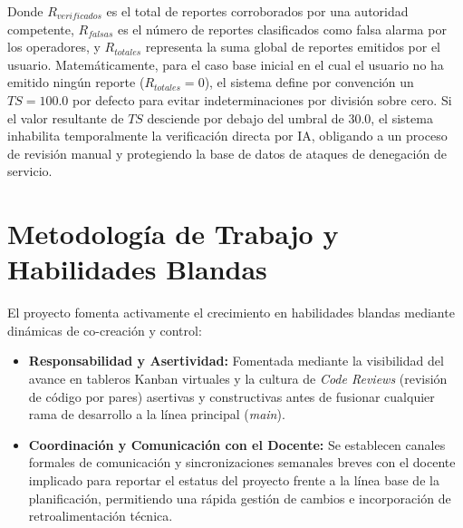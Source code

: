 \documentclass[conference]{IEEEtran}
\begin{document}
Donde $R_{verificados}$ es el total de reportes corroborados por una autoridad competente, $R_{falsas}$ es el número de reportes clasificados como falsa alarma por los operadores, y $R_{totales}$ representa la suma global de reportes emitidos por el usuario. Matemáticamente, para el caso base inicial en el cual el usuario no ha emitido ningún reporte ($R_{totales} = 0$), el sistema define por convención un $TS = 100.0$ por defecto para evitar indeterminaciones por división sobre cero. Si el valor resultante de $TS$ desciende por debajo del umbral de $30.0$, el sistema inhabilita temporalmente la verificación directa por IA, obligando a un proceso de revisión manual y protegiendo la base de datos de ataques de denegación de servicio.

\section{Metodología de Trabajo y Habilidades Blandas}
El proyecto fomenta activamente el crecimiento en habilidades blandas mediante dinámicas de co-creación y control:
\begin{itemize}
    \item \textbf{Responsabilidad y Asertividad:} Fomentada mediante la visibilidad del avance en tableros Kanban virtuales y la cultura de \textit{Code Reviews} (revisión de código por pares) asertivas y constructivas antes de fusionar cualquier rama de desarrollo a la línea principal (\textit{main}).
    \item \textbf{Coordinación y Comunicación con el Docente:} Se establecen canales formales de comunicación y sincronizaciones semanales breves con el docente implicado para reportar el estatus del proyecto frente a la línea base de la planificación, permitiendo una rápida gestión de cambios e incorporación de retroalimentación técnica.
\end{itemize}
\end{document}
